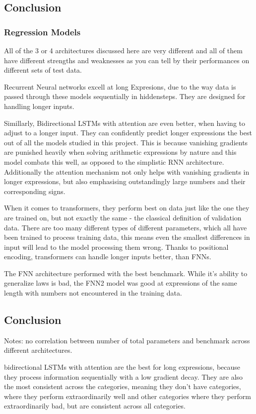 \documentclass{article}
\begin{document}
\subsection{Conclusion}

\subsubsection{Regression Models}
All of the 3 or 4 architectures discussed here are very different and all of 
them have different strengths and weaknesses as you can tell by their 
performances on different sets of test data.

Recurrent Neural networks excell at long Expresions, due to the way data is 
passed through these models sequentially in hiddensteps. They are designed for 
handling longer inputs.

Simillarly, Bidirectional LSTMs with attention are even better, when having to 
adjust to a longer input. They can confidently predict longer expressions the 
best out of all the models studied in this project. This is because vanishing 
gradients are punished heavily when solving arithmetic expressions by nature and 
this model combats this well, as opposed to the simplistic RNN architecture. 
Additionally the attention mechanism not only helps with vanishing gradients in 
longer expressions, but also emphasising outstandingly large numbers and their 
corresponding signs.

When it comes to transformers, they perform best on data just like the one they 
are trained on, but not exactly the same - the classical definition of 
validation data. There are too many different types of different parameters, 
which all have been trained to process training data, this means even the 
smallest differences in input will lead to the model processing them wrong.
Thanks to positional encoding, transformers can handle longer inputs better, 
than FNNs.

The FNN architecture performed with the best benchmark. While it's ability to 
generalize laws is bad, the FNN2 model was good at expressions of the same 
length with numbers not encountered in the training data.

\subsection{Conclusion}

Notes: no correlation between number of total parameters and benchmark across 
different architectures.

bidirectional LSTMs with attention are the best for long expressions, because 
they process information sequentially with a low gradient decay. They are also 
the most consistent across the categories, meaning they don't have categories, 
where they perform extraordinarily well and other categories where they perform 
extraordinarily bad, but are consistent across all categories.

\newpage
\printbibliography[heading=bibintoc]
\end{document}
